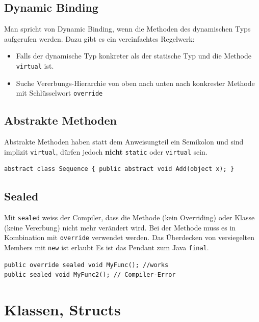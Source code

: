 \documentclass[
a4paper,
oneside,
10pt,
fleqn,
headsepline,
toc=listofnumbered, 
bibliography=totocnumbered]{scrartcl}
\let\stdsection\section
\renewcommand\section{\clearpage\stdsection}
\begin{document}
\subsection{Dynamic Binding}
Man spricht von Dynamic Binding, wenn die Methoden des dynamischen Typs aufgerufen werden. Dazu gibt es ein vereinfachtes Regelwerk:
\begin{itemize}
	\item Falls der dynamische Typ konkreter als der statische Typ und die Methode \lstinline|virtual| ist.
	\item Suche Vererbungs-Hierarchie von oben nach unten nach konkrester Methode mit Schlüsselwort \lstinline|override|
\end{itemize}

\subsection{Abstrakte Methoden}
Abstrakte Methoden haben statt dem Anweisungteil ein Semikolon und sind implizit \lstinline|virtual|, dürfen jedoch \textbf{nicht} \lstinline|static| oder \lstinline|virtual| sein.
\begin{lstlisting}
abstract class Sequence { public abstract void Add(object x); }
\end{lstlisting}

\subsection{Sealed}
Mit \lstinline|sealed| weiss der Compiler, dass die Methode (kein Overriding) oder Klasse (keine Vererbung) nicht mehr verändert wird.
Bei der Methode muss es in Kombination mit \lstinline|override| verwendet werden.
Das Überdecken von versiegelten Members mit \lstinline|new| ist erlaubt
Es ist das Pendant zum Java \lstinline|final|.
\begin{lstlisting} 
public override sealed void MyFunc(); //works
public sealed void MyFunc2(); // Compiler-Error
\end{lstlisting}

\section{Klassen, Structs}
\end{document}
